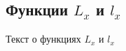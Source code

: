\subsection{\texorpdfstring{Функции $L_{x}$ и $l_{x}$}{Функции Lx и lx}}
Текст о функциях $L_{x}$ и $l_{x}$
